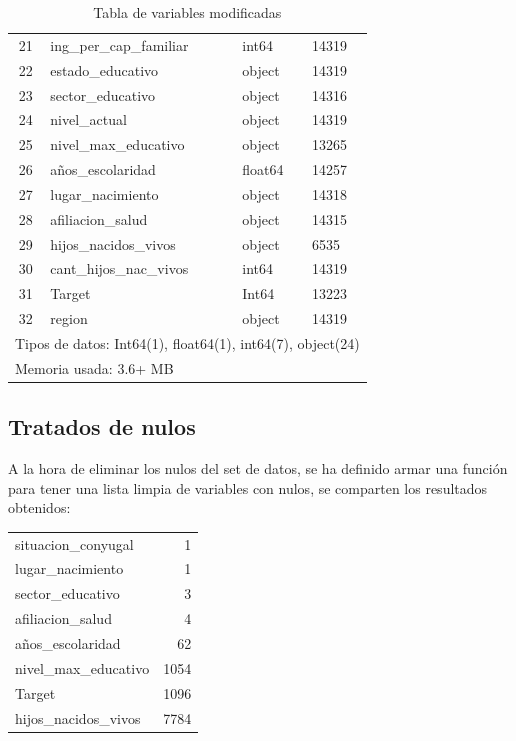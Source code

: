 \documentclass[a4paper]{article}
\begin{document}
\begin{table}[H]
\begin{tabular}{clll}
            21  & ing\_per\_cap\_familiar & int64 & 14319 \\ 
            22  & estado\_educativo & object & 14319 \\ 
            23  & sector\_educativo & object & 14316 \\ 
            24  & nivel\_actual & object & 14319 \\ 
            25  & nivel\_max\_educativo & object & 13265 \\ 
            26  & años\_escolaridad & float64 & 14257 \\ 
            27  & lugar\_nacimiento & object & 14318 \\ 
            28  & afiliacion\_salud & object & 14315 \\ 
            29  & hijos\_nacidos\_vivos & object & 6535 \\ 
            30  & cant\_hijos\_nac\_vivos & int64 & 14319 \\ 
            31  & Target & Int64 & 13223 \\ 
            32  & region & object & 14319 \\
            \multicolumn{4}{l}{Tipos de datos: Int64(1), float64(1), int64(7), object(24)} \\
            \multicolumn{4}{l}{Memoria usada: 3.6+ MB } \\
        \end{tabular}
        \caption{Tabla de variables modificadas}
        \label{final table of inputs and Target}
    \end{table}

    \subsection{Tratados de nulos}

        A la hora de eliminar los nulos del set de datos, se ha definido armar una función para tener una lista limpia de variables con nulos, se comparten los resultados obtenidos:

        \begin{table}[H]
            \begin{tabular}{lr}
                situacion\_conyugal & 1 \\ 
                lugar\_nacimiento & 1 \\ 
                sector\_educativo & 3 \\ 
                afiliacion\_salud & 4 \\ 
                años\_escolaridad & 62 \\ 
                nivel\_max\_educativo & 1054 \\ 
                Target & 1096 \\ 
                hijos\_nacidos\_vivos & 7784 \\ 
            \end{tabular}
        \end{table}
\end{document}
